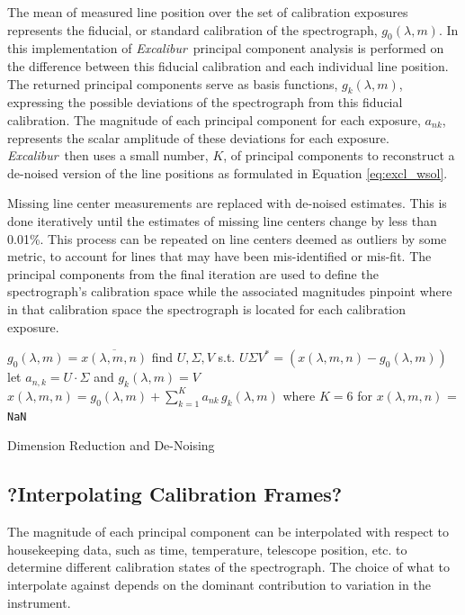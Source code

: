 \documentclass[12pt, onecolumn]{aastex63}
\newcommand{\project}[1]{\textsl{#1}}
\newcommand{\name}{\project{Excalibur}}
\newcommand{\code}[1]{\texttt{#1}}
\begin{document}
The mean of measured line position over the set of calibration exposures represents the fiducial, or standard calibration of the spectrograph, $g_0(\lambda,m)$.  In this implementation of \name\, principal component analysis is performed on the difference between this fiducial calibration and each individual line position.  The returned principal components serve as basis functions,  $g_k(\lambda,m)$, expressing the possible deviations of the spectrograph from this fiducial calibration.  The magnitude of each principal component for each exposure, $a_{nk}$, represents the scalar amplitude of these deviations for each exposure.  \name\ then uses a small number, $K$, of principal components to reconstruct a de-noised version of the line positions as formulated in Equation \ref{eq:excl_wsol}.

Missing line center measurements are replaced with de-noised estimates.  This is done iteratively until the estimates of missing line centers change by less than 0.01\%.  This process can be repeated on line centers deemed as outliers by some metric, to account for lines that may have been mis-identified or mis-fit.  The principal components from the final iteration are used to define the spectrograph's calibration space while the associated magnitudes pinpoint where in that calibration space the spectrograph is located for each calibration exposure.

\begin{algorithm}
\SetAlgoLined
{}
{
	$g_0(\lambda,m) = \overline{x(\lambda,m,n)}$\;
	find $U, \Sigma, V$ s.t. $U\Sigma V^* = (x(\lambda,m,n)-g_0(\lambda,m))$\;
	let $a_{n,k} = U\cdot \Sigma$ and $g_k(\lambda,m) = V$\;
	$x(\lambda,m,n) = g_0(\lambda,m) + \sum_{k=1}^K a_{nk}\,g_k(\lambda,m)$ where $K=6$ for $x(\lambda,m,n)$ = \code{NaN}
	}
\caption{Dimension Reduction and De-Noising}
\end{algorithm}

\subsection{?Interpolating Calibration Frames?}
 \label{sec:interp_time}
The magnitude of each principal component can be interpolated with respect to housekeeping data, such as time, temperature, telescope position, etc. to determine different calibration states of the spectrograph.  The choice of what to interpolate against depends on the dominant contribution to variation in the instrument.
\end{document}
